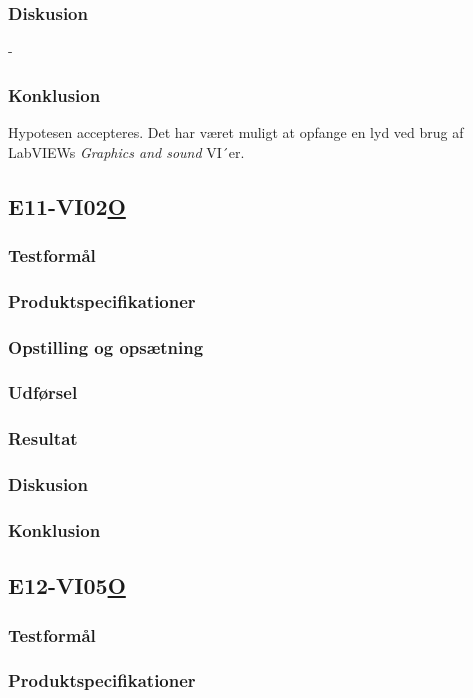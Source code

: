\subsubsection{Diskusion}
-
\subsubsection{Konklusion}
Hypotesen accepteres. Det har været muligt at opfange en lyd ved brug af LabVIEWs \textit{Graphics and sound} VI´er. 



\subsection{E11-VI02\underline{O}}
\subsubsection{Testformål}
\subsubsection{Produktspecifikationer}
\subsubsection{Opstilling og opsætning}
\subsubsection{Udførsel}
\subsubsection{Resultat}
\subsubsection{Diskusion}
\subsubsection{Konklusion}

\subsection{E12-VI05\underline{O}}
\subsubsection{Testformål}
\subsubsection{Produktspecifikationer}
